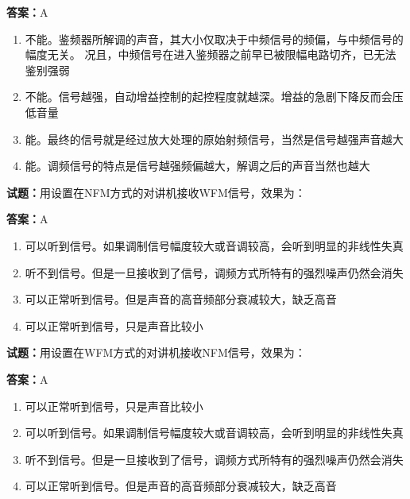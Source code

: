 \documentclass{ctexbook}
\begin{document}
\textbf{答案：}A 

\begin{enumerate}[leftmargin=3em]
  \item 不能。鉴频器所解调的声音，其大小仅取决于中频信号的频偏，与中频信号的幅度无关。
况且，中频信号在进入鉴频器之前早已被限幅电路切齐，已无法鉴别强弱 

  \item 不能。信号越强，自动增益控制的起控程度就越深。增益的急剧下降反而会压低音量 

  \item 能。最终的信号就是经过放大处理的原始射频信号，当然是信号越强声音越大 


  \item 能。调频信号的特点是信号越强频偏越大，解调之后的声音当然也越大 

\end{enumerate}





\vspace{1em}

\textbf{试题：}用设置在NFM方式的对讲机接收WFM信号，效果为： 

\textbf{答案：}A 

\begin{enumerate}[leftmargin=3em]
  \item 可以听到信号。如果调制信号幅度较大或音调较高，会听到明显的非线性失真 

  \item 听不到信号。但是一旦接收到了信号，调频方式所特有的强烈噪声仍然会消失 

  \item 可以正常听到信号。但是声音的高音频部分衰减较大，缺乏高音 

  \item 可以正常听到信号，只是声音比较小 

\end{enumerate}





\vspace{1em}

\textbf{试题：}用设置在WFM方式的对讲机接收NFM信号，效果为： 

\textbf{答案：}A 

\begin{enumerate}[leftmargin=3em]
  \item 可以正常听到信号，只是声音比较小 

  \item 可以听到信号。如果调制信号幅度较大或音调较高，会听到明显的非线性失真 

  \item 听不到信号。但是一旦接收到了信号，调频方式所特有的强烈噪声仍然会消失 

  \item 可以正常听到信号。但是声音的高音频部分衰减较大，缺乏高音 

\end{enumerate}
\end{document}
